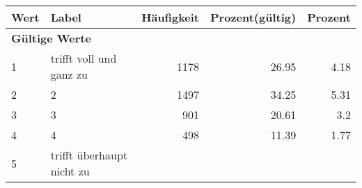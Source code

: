      \begin{longtable}{lXrrr}
     \toprule
     \textbf{Wert} & \textbf{Label} & \textbf{Häufigkeit} & \textbf{Prozent(gültig)} & \textbf{Prozent} \\
     \endhead
     \midrule
     \multicolumn{5}{l}{\textbf{Gültige Werte}}\\

     1 &
     \multicolumn{1}{X}{ trifft voll und ganz zu   } &


       \num{1178} &
       \num[round-mode=places,round-precision=2]{26,95} &
         \num[round-mode=places,round-precision=2]{4,18} \\

     2 &
     \multicolumn{1}{X}{ 2   } &


       \num{1497} &
       \num[round-mode=places,round-precision=2]{34,25} &
         \num[round-mode=places,round-precision=2]{5,31} \\

     3 &
     \multicolumn{1}{X}{ 3   } &


       \num{901} &
       \num[round-mode=places,round-precision=2]{20,61} &
         \num[round-mode=places,round-precision=2]{3,2} \\

     4 &
     \multicolumn{1}{X}{ 4   } &


       \num{498} &
       \num[round-mode=places,round-precision=2]{11,39} &
         \num[round-mode=places,round-precision=2]{1,77} \\

     5 &
     \multicolumn{1}{X}{ trifft überhaupt nicht zu   } &



\end{longtable}
